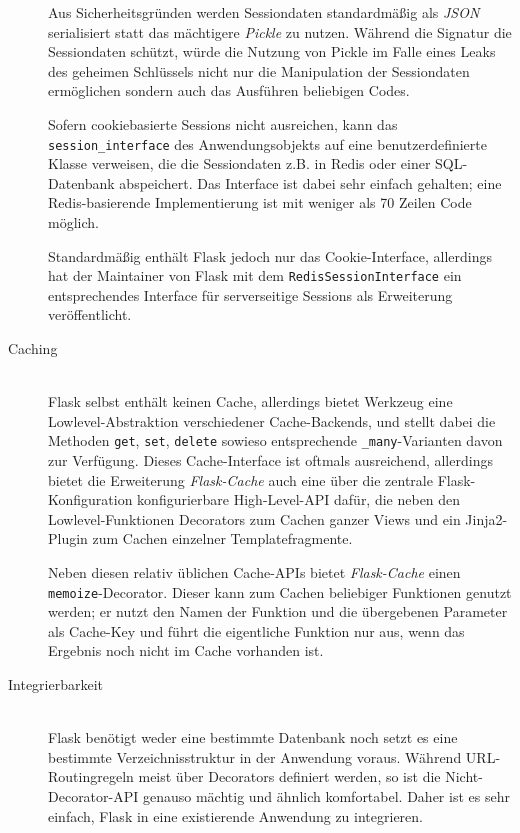 \begin{description}
Aus Sicherheitsgründen werden Sessiondaten standardmäßig als \emph{JSON} serialisiert statt das
mächtigere \emph{Pickle} zu nutzen. Während die Signatur die Sessiondaten schützt, würde die Nutzung
von Pickle im Falle eines Leaks des geheimen Schlüssels nicht nur die Manipulation der Sessiondaten
ermöglichen sondern auch das Ausführen beliebigen Codes.

Sofern cookiebasierte Sessions nicht ausreichen, kann das \lstinline{session_interface} des
Anwendungsobjekts auf eine benutzerdefinierte Klasse verweisen, die die Sessiondaten z.B. in Redis
oder einer SQL-Datenbank abspeichert. Das Interface ist dabei sehr einfach gehalten; eine
Redis-basierende Implementierung ist mit weniger als 70 Zeilen Code möglich.

Standardmäßig enthält Flask jedoch nur das Cookie-Interface, allerdings hat der Maintainer von Flask
mit dem \lstinline{RedisSessionInterface} ein entsprechendes Interface für serverseitige Sessions
als Erweiterung veröffentlicht.


\item[Caching] \hfill \\
Flask selbst enthält keinen Cache, allerdings bietet Werkzeug eine Lowlevel-Abstraktion
verschiedener Cache-Backends, und stellt dabei die Methoden \lstinline{get}, \lstinline{set},
\lstinline{delete} sowieso entsprechende \lstinline{_many}-Varianten davon zur Verfügung. Dieses
Cache-Interface ist oftmals ausreichend, allerdings bietet die Erweiterung \emph{Flask-Cache} auch
eine über die zentrale Flask-Konfiguration konfigurierbare High-Level-API dafür, die neben den
Lowlevel-Funktionen Decorators zum Cachen ganzer Views und ein Jinja2-Plugin zum Cachen einzelner
Templatefragmente.

Neben diesen relativ üblichen Cache-APIs bietet \emph{Flask-Cache} einen
\lstinline{memoize}-Decorator. Dieser kann zum Cachen beliebiger Funktionen genutzt werden; er nutzt
den Namen der Funktion und die übergebenen Parameter als Cache-Key und führt die eigentliche
Funktion nur aus, wenn das Ergebnis noch nicht im Cache vorhanden ist.


\item[Integrierbarkeit] \hfill \\
Flask benötigt weder eine bestimmte Datenbank noch setzt es eine bestimmte Verzeichnisstruktur in
der Anwendung voraus. Während URL-Routingregeln meist über Decorators definiert werden, so ist die
Nicht-Decorator-API genauso mächtig und ähnlich komfortabel. Daher ist es sehr einfach, Flask in
eine existierende Anwendung zu integrieren.


\end{description}
